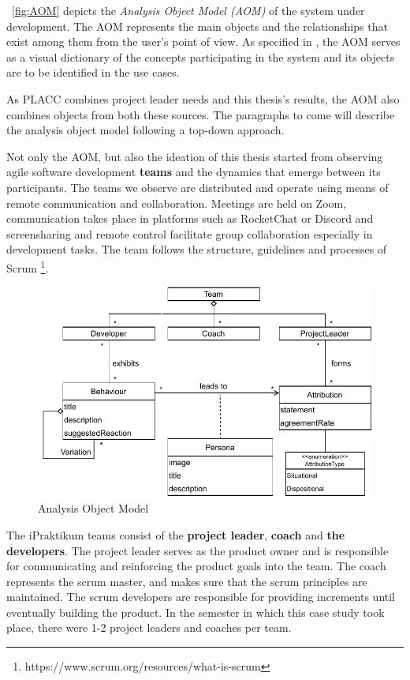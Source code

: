 ~\autoref{fig:AOM} depicts the \textit{Analysis Object Model (AOM)} of the system under development. The AOM represents the main objects and the relationships that exist among them from the user's point of view.  As specified in \cite{bruegge2004object}, the AOM serves as a visual dictionary of the concepts participating in the system and its objects are to be identified in the use cases. 

As PLACC combines project leader needs and this thesis's results, the AOM also combines objects from both these sources. The paragraphs to come will describe the analysis object model following a top-down approach.

Not only the AOM,  but also the ideation of this thesis started from observing agile software development \textbf{teams} and the dynamics that emerge between its participants. The teams we observe are distributed and operate using means of remote communication and collaboration. Meetings are held on Zoom, communication takes place in platforms such as RocketChat or Discord and screensharing and remote control facilitate group collaboration especially in development tasks. The team follows the structure, guidelines and processes of Scrum \footnote{https://www.scrum.org/resources/what-is-scrum}.

\begin{figure}
	\includegraphics[]{figures/AOM2.pdf}
	\caption{Analysis Object Model}
	\label{fig:AOM}
\end{figure}

The iPraktikum teams consist of the \textbf{project leader}, \textbf{coach} and \textbf{the developers}. The project leader serves as the product owner and is responsible for communicating and reinforcing the product goals into the team. The coach represents the scrum master, and makes sure that the scrum principles are maintained. The scrum developers are responsible for providing increments until eventually building the product. In the semester in which this case study took place, there were 1-2 project leaders and coaches per team. 

